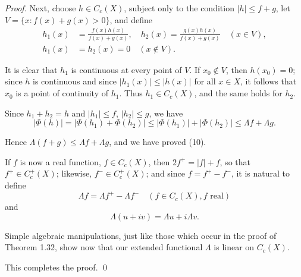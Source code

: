 \begin{proof}
  Next, choose $h \in C_c(X)$, subject only to the condition $|h| \leq f + g$, let $V = \{x : f(x) + g(x) > 0\}$, and define
  \begin{align}
    h_1(x) & = \frac{f(x)h(x)}{f(x) + g(x)}, \quad h_2(x) = \frac{g(x)h(x)}{f(x) + g(x)} \quad (x \in V), \tag{12} \\
    h_1(x) & = h_2(x) = 0 \quad (x \notin V).
  \end{align}

  It is clear that $h_1$ is continuous at every point of $V$. If $x_0 \notin V$, then $h(x_0) = 0$; since $h$ is continuous and since $|h_1(x)| \leq |h(x)|$ for all $x \in X$, it follows that $x_0$ is a point of continuity of $h_1$. Thus $h_1 \in C_c(X)$, and the same holds for $h_2$.

  Since $h_1 + h_2 = h$ and $|h_1| \leq f$, $|h_2| \leq g$, we have
  \begin{equation}
    |\Phi(h)| = |\Phi(h_1) + \Phi(h_2)| \leq |\Phi(h_1)| + |\Phi(h_2)| \leq \Lambda f + \Lambda g.
  \end{equation}

  Hence $\Lambda(f + g) \leq \Lambda f + \Lambda g$, and we have proved (10).

  If $f$ is now a real function, $f \in C_c(X)$, then $2f^+ = |f| + f$, so that $f^+ \in C_c^+(X)$; likewise, $f^- \in C_c^+(X)$; and since $f = f^+ - f^-$, it is natural to define
  \begin{equation}
    \Lambda f = \Lambda f^+ - \Lambda f^- \quad (f \in C_c(X), f \text{ real}) \tag{13}
  \end{equation}
  and
  \begin{equation}
    \Lambda(u + iv) = \Lambda u + i\Lambda v. \tag{14}
  \end{equation}

  Simple algebraic manipulations, just like those which occur in the proof of Theorem 1.32, show now that our extended functional $\Lambda$ is linear on $C_c(X)$.

  This completes the proof. \qed
\end{proof}
